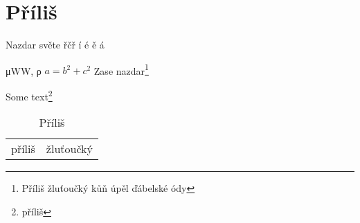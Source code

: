 \documentclass{article}
\begin{document}
\tableofcontents
\section{Příliš}
Nazdar světe \v{r}\v{c}\v{r} \'i \'e \v{e} \'a


\textgreek{μWW, ρ } 
\(a=b^2 + c^2\)
Zase nazdar\footnote{Příliš žluťoučký kůň úpěl ďábelské ódy}

Some text\footnote{příliš}

\begin{table}
\begin{tabular}{ll}
  příliš & žluťoučký
\end{tabular}
\caption{Příliš}
\end{table}
\end{document}
